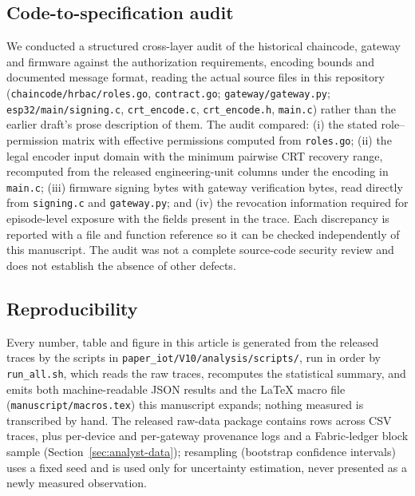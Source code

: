 \subsection{Code-to-specification audit}
\label{sec:audit-method}

We conducted a structured cross-layer audit of the historical chaincode, gateway and firmware against the authorization requirements, encoding bounds and documented message format, reading the actual source files in this repository (\texttt{chaincode/hrbac/roles.go}, \texttt{contract.go}; \texttt{gateway/gateway.py}; \texttt{esp32/main/signing.c}, \texttt{crt\_encode.c}, \texttt{crt\_encode.h}, \texttt{main.c}) rather than the earlier draft's prose description of them. The audit compared: (i) the stated role--permission matrix with effective permissions computed from \texttt{roles.go}; (ii) the legal encoder input domain with the minimum pairwise CRT recovery range, recomputed from the released engineering-unit columns under the encoding in \texttt{main.c}; (iii) firmware signing bytes with gateway verification bytes, read directly from \texttt{signing.c} and \texttt{gateway.py}; and (iv) the revocation information required for episode-level exposure with the fields present in the trace. Each discrepancy is reported with a file and function reference so it can be checked independently of this manuscript. The audit was not a complete source-code security review and does not establish the absence of other defects.

\subsection{Reproducibility}

Every number, table and figure in this article is generated from the released traces by the scripts in \texttt{paper\_iot/V10/analysis/scripts/}, run in order by \texttt{run\_all.sh}, which reads the raw traces, recomputes the statistical summary, and emits both machine-readable JSON results and the LaTeX macro file (\texttt{manuscript/macros.tex}) this manuscript expands; nothing measured is transcribed by hand. The released raw-data package contains \ReleasedRowsTotal{} rows across \ReleasedTracesCount{} CSV traces, plus per-device and per-gateway provenance logs and a Fabric-ledger block sample (Section~\ref{sec:analyst-data}); resampling (bootstrap confidence intervals) uses a fixed seed and is used only for uncertainty estimation, never presented as a newly measured observation.
